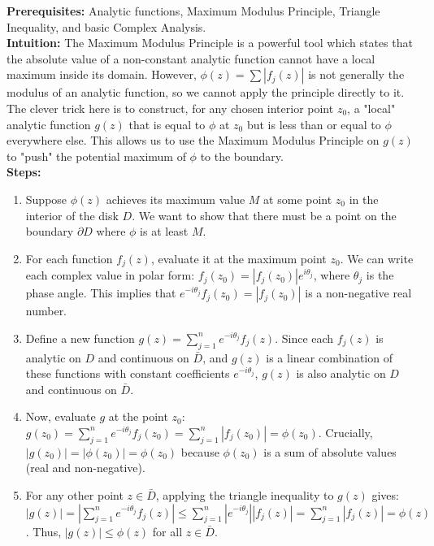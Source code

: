 \begin{solution}
\textbf{Prerequisites:} Analytic functions, Maximum Modulus Principle, Triangle Inequality, and basic Complex Analysis. \\[1em]
\textbf{Intuition:} The Maximum Modulus Principle is a powerful tool which states that the absolute value of a non-constant analytic function cannot have a local maximum inside its domain. However, $\phi(z) = \sum |f_j(z)|$ is not generally the modulus of an analytic function, so we cannot apply the principle directly to it. The clever trick here is to construct, for any chosen interior point $z_0$, a "local" analytic function $g(z)$ that is equal to $\phi$ at $z_0$ but is less than or equal to $\phi$ everywhere else. This allows us to use the Maximum Modulus Principle on $g(z)$ to "push" the potential maximum of $\phi$ to the boundary. \\[1em]
\textbf{Steps:}
\begin{enumerate}
    \item Suppose $\phi(z)$ achieves its maximum value $M$ at some point $z_0$ in the interior of the disk $D$. We want to show that there must be a point on the boundary $\partial D$ where $\phi$ is at least $M$.

    \item For each function $f_j(z)$, evaluate it at the maximum point $z_0$. We can write each complex value in polar form: $f_j(z_0) = |f_j(z_0)|e^{i\theta_j}$, where $\theta_j$ is the phase angle. This implies that $e^{-i\theta_j} f_j(z_0) = |f_j(z_0)|$ is a non-negative real number.

    \item Define a new function $g(z) = \sum_{j=1}^n e^{-i\theta_j} f_j(z)$. Since each $f_j(z)$ is analytic on $D$ and continuous on $\bar{D}$, and $g(z)$ is a linear combination of these functions with constant coefficients $e^{-i\theta_j}$, $g(z)$ is also analytic on $D$ and continuous on $\bar{D}$.

    \item Now, evaluate $g$ at the point $z_0$:
    $g(z_0) = \sum_{j=1}^n e^{-i\theta_j} f_j(z_0) = \sum_{j=1}^n |f_j(z_0)| = \phi(z_0)$.
    Crucially, $|g(z_0)| = | \phi(z_0) | = \phi(z_0)$ because $\phi(z_0)$ is a sum of absolute values (real and non-negative).

    \item For any other point $z \in \bar{D}$, applying the triangle inequality to $g(z)$ gives:
    $|g(z)| = \left| \sum_{j=1}^n e^{-i\theta_j} f_j(z) \right| \leq \sum_{j=1}^n |e^{-i\theta_j}| |f_j(z)| = \sum_{j=1}^n |f_j(z)| = \phi(z)$.
    Thus, $|g(z)| \leq \phi(z)$ for all $z \in \bar{D}$.


\end{enumerate}
\end{solution}
